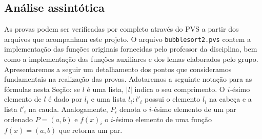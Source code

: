 \subsection{Análise assintótica}

As provas podem ser verificadas por completo através do PVS a partir
dos arquivos que acompanham este projeto. O arquivo \texttt{bubblesort2.pvs}
contem a implementação das funções originais fornecidas pelo professor da
disciplina, bem como a implementação das funções auxiliares e dos lemas
elaborados pelo grupo. Apresentaremos a seguir um detalhamento dos pontos que
consideramos fundamentais na realização das provas. Adotaremos a seguinte notação
para as fórmulas nesta Seção: se $l$ é uma lista, $|l|$ indica o seu comprimento.
O $i$-ésimo elemento de $l$ é dado por $l_i$ e uma lista $l_i:l'_i$ possui o
elemento $l_i$ na cabeça e a lista $l'_i$ na cauda.
Analogamente, $P_i$ denota o $i$-ésimo elemento de um par ordenado $P=(a,b)$ e
$f(x)_i$ o $i$-ésimo elemento de uma função $f(x)=(a,b)$ que retorna um par.

